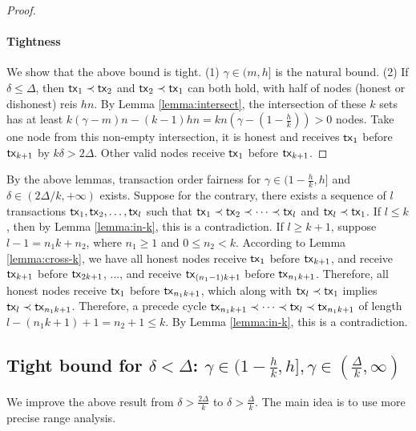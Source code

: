 \documentclass[runningheads]{llncs}
\begin{document}
\begin{proof}
\paragraph{Tightness} We show that the above bound is tight. (1) $\gamma\in(m,h]$ is the natural bound. (2) If $\delta\le \Delta$, then $\mathsf{tx}_1\prec\mathsf{tx}_2$ and $\mathsf{tx}_2\prec\mathsf{tx}_1$ can both hold, with half of nodes (honest or dishonest) reis $hn$. By Lemma \ref{lemma:intersect}, the intersection of these $k$ sets has at least $k(\gamma-m)n - (k-1)hn = kn(\gamma - (1-\frac{h}{k})) > 0$ nodes. Take one node from this non-empty intersection, it is honest and receives $\mathsf{tx}_1$ before $\mathsf{tx}_{k+1}$ by $k\delta > 2\Delta$. Other valid nodes receive $\mathsf{tx}_1$ before $\mathsf{tx}_{k+1}$. 
\end{proof}

By the above lemmas, transaction order fairness for $\gamma\in(1-\frac{h}{k}, h]$ and $\delta\in(2\Delta/k, +\infty)$ exists. Suppose for the contrary, there exists a sequence of $l$ transactions $\mathsf{tx}_1, \mathsf{tx}_2, \dots, \mathsf{tx}_l$ such that $\mathsf{tx}_1\prec \mathsf{tx}_2\prec \cdots \prec \mathsf{tx}_l$ and $\mathsf{tx}_l\prec \mathsf{tx}_1$. If $l\le k$, then by Lemma \ref{lemma:in-k}, this is a contradiction. If $l\ge k+1$, suppose $l-1=n_1 k + n_2$, where $n_1 \ge 1$ and $0 \le n_2 <k$. According to Lemma \ref{lemma:cross-k}, we have all honest nodes receive $\mathsf{tx}_1$ before $\mathsf{tx}_{k+1}$, and receive $\mathsf{tx}_{k+1}$ before $\mathsf{tx}_{2k+1}$, ..., and receive $\mathsf{tx}_{(n_1-1)k+1}$ before $\mathsf{tx}_{n_1 k +1}$. Therefore, all honest nodes receive $\mathsf{tx}_1$ before $\mathsf{tx}_{n_1 k+1}$, which along with $\mathsf{tx}_l\prec \mathsf{tx}_1$ implies $\mathsf{tx}_l\prec \mathsf{tx}_{n_1 k +1}$. Therefore, a precede cycle $\mathsf{tx}_{n_1 k+1} \prec \cdots \prec \mathsf{tx}_l \prec \mathsf{tx}_{n_1 k +1}$ of length $l-(n_1 k + 1)+1 = n_2+1\le k$. By Lemma \ref{lemma:in-k}, this is a contradiction. 

\subsection{Tight bound for $\delta<\Delta$: $\gamma\in (1-\frac{h}{k}, h], \gamma\in (\frac{\Delta}{k}, \infty)$}

We improve the above result from $\delta>\frac{2\Delta}{k}$ to $\delta>\frac{\Delta}{k}$. The main idea is to use more precise range analysis. 
\end{document}
